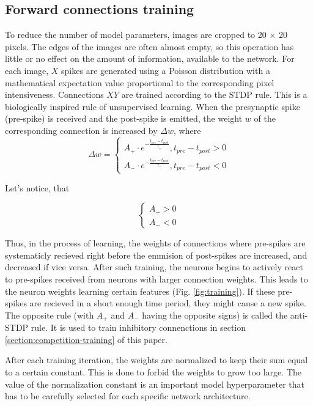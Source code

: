 \documentclass[a4paper]{article}
\begin{document}
\subsection{Forward connections training}
To reduce the number of model parameters, images are cropped to 20 $\times$ 20 pixels. The edges of the images are often almost empty, so this operation has little or no effect on the amount of information, available to the network. For each image, $X$ spikes are generated using a Poisson distribution with a mathematical expectation value  proportional to the corresponding pixel intensiveness. Connections $XY$ are trained according to the STDP \cite{STDP} rule. This is a biologically inspired rule of unsupervised learning. When the presynaptic spike (pre-spike) is received and the post-spike is emitted, the weight $w$ of the corresponding connection is increased by $ \Delta w $, where
\begin{equation} 
\Delta w =
 \begin{cases}
 A_+ \cdot e^{- \frac{t_{pre} - t_{post}}{\tau_+}}, t_{pre} - t_{post} > 0\\
 A_- \cdot e^{- \frac{t_{pre} - t_{post}}{\tau_-}}, t_{pre} - t_{post} < 0
 \end{cases}
\end{equation}

Let's notice, that

$$
\begin{cases}
 A_{+} > 0\\
 A_{-} < 0
\end{cases}
$$

Thus, in the process of learning, the weights of connections where pre-spikes are systematicly recieved right before the emmision of post-spikes are increased, and decreased if vice versa. After such training, the neurons begins to actively react to pre-spikes received from neurons with larger connection weights. This leads to the neuron weights learning certain features (Fig. \ref{fig:training}). If these pre-spikes are recieved in a short enough time period, they might cause a new spike. The opposite rule (with $A_{+}$ and $A_{-}$ having the opposite signs) is called the anti-STDP \cite{anti-STDP} rule. It is used to train inhibitory connenctions in section \ref{section:competition-training} of this paper.

After each training iteration, the weights are normalized to keep their sum equal to a certain constant. This is done to forbid the weights to grow too large. The value of the normalization constant is an important model hyperparameter that has to be carefully selected for each specific network architecture.
\end{document}
